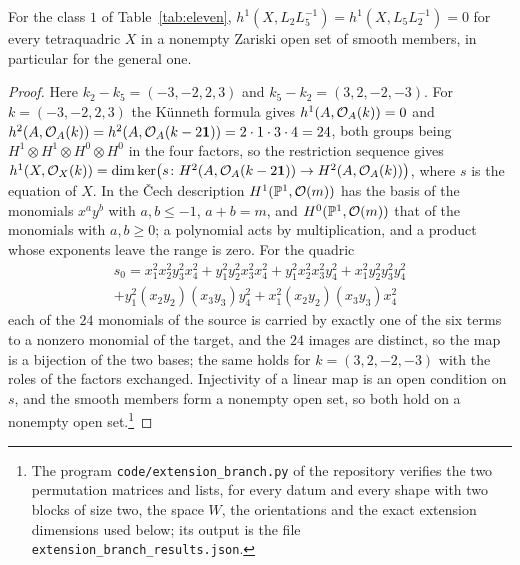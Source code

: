 \begin{lemma}\label{lem:genericvanishing}
For the class $1$ of Table~\ref{tab:eleven}, $h^1(X,L_2L_5^{-1})=
h^1(X,L_5L_2^{-1})=0$ for every tetraquadric $X$ in a nonempty Zariski
open set of smooth members, in particular for the general one.
\end{lemma}
\begin{proof}
Here $k_2-k_5=(-3,-2,2,3)$ and $k_5-k_2=(3,2,-2,-3)$. For $k=(-3,-2,2,3)$
the K\"unneth formula gives $h^1(A,\mathcal{O}_A(k))=0$ and
$h^2(A,\mathcal{O}_A(k))=h^2(A,\mathcal{O}_A(k-2\mathbf{1}))=2\cdot1\cdot3\cdot4=24$, both
groups being $H^1\otimes H^1\otimes H^0\otimes H^0$ in the four factors, so
the restriction sequence gives $h^1(X,\mathcal{O}_X(k))=\dim\ker\bigl(s\colon
H^2(A,\mathcal{O}_A(k-2\mathbf{1}))\to H^2(A,\mathcal{O}_A(k))\bigr)$, where $s$ is the
equation of $X$. In the \v{C}ech description $H^1(\mathbb{P}^1,\mathcal{O}(m))$ has the
basis of the monomials $x^ay^b$ with $a,b\le-1$, $a+b=m$, and
$H^0(\mathbb{P}^1,\mathcal{O}(m))$ that of the monomials with $a,b\ge0$; a polynomial
acts by multiplication, and a product whose exponents leave the range is
zero. For the quadric
\begin{multline*}
 s_0=x_1^2x_2^2y_3^2x_4^2+y_1^2y_2^2x_3^2x_4^2+y_1^2x_2^2x_3^2y_4^2
 +x_1^2y_2^2y_3^2y_4^2\\+y_1^2(x_2y_2)(x_3y_3)y_4^2+x_1^2(x_2y_2)(x_3y_3)x_4^2
\end{multline*}
each of the $24$ monomials of the source is carried by exactly one of the
six terms to a nonzero monomial of the target, and the $24$ images are
distinct, so the map is a bijection of the two bases; the same holds for
$k=(3,2,-2,-3)$ with the roles of the factors exchanged. Injectivity of a
linear map is an open condition on $s$, and the smooth members form a
nonempty open set, so both hold on a nonempty open set.\footnote{The
program \texttt{code/extension\_branch.py} of the repository verifies the
two permutation matrices and lists, for every datum and every shape with
two blocks of size two, the space $W$, the orientations and the exact
extension dimensions used below; its output is the file
\texttt{extension\_branch\_results.json}.}
\end{proof}

